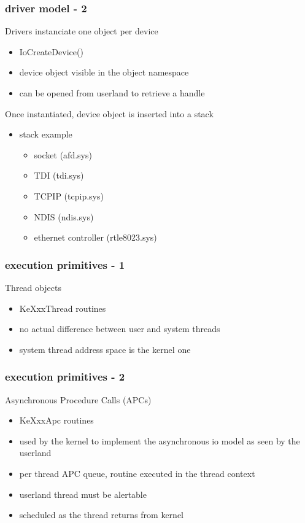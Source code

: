 
\begin{frame}
 \frametitle{driver model - 2}

 Drivers instanciate one object per device

 \begin{itemize}
  \item IoCreateDevice()
  \item device object visible in the object namespace
  \item can be opened from userland to retrieve a handle
 \end{itemize}

 Once instantiated, device object is inserted into a stack

 \begin{itemize}
  \item stack example
   \begin{itemize}
    \item socket (afd.sys)
    \item TDI (tdi.sys)
    \item TCPIP (tcpip.sys)
    \item NDIS (ndis.sys)
    \item ethernet controller (rtle8023.sys)
   \end{itemize}

 \end{itemize}

\end{frame}


\begin{frame}
 \frametitle{execution primitives - 1}

 Thread objects

 \begin{itemize}
  \item KeXxxThread routines
  \item no actual difference between user and system threads
  \item system thread address space is the kernel one
 \end{itemize}

\end{frame}


\begin{frame}
 \frametitle{execution primitives - 2}

 Asynchronous Procedure Calls (APCs)

 \begin{itemize}
  \item KeXxxApc routines
  \item used by the kernel to implement the asynchronous io model as seen by the userland
  \item per thread APC queue, routine executed in the thread context
  \item userland thread must be alertable
  \item scheduled as the thread returns from kernel
 \end{itemize}

\end{frame}

